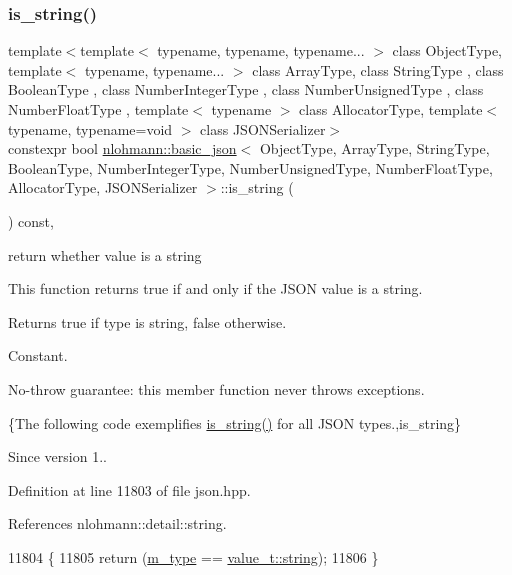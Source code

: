 \subsubsection{\texorpdfstring{is\+\_\+string()}{is\_string()}}
{\footnotesize\ttfamily template$<$template$<$ typename, typename, typename... $>$ class Object\+Type, template$<$ typename, typename... $>$ class Array\+Type, class String\+Type , class Boolean\+Type , class Number\+Integer\+Type , class Number\+Unsigned\+Type , class Number\+Float\+Type , template$<$ typename $>$ class Allocator\+Type, template$<$ typename, typename=void $>$ class J\+S\+O\+N\+Serializer$>$ \\
constexpr bool \hyperlink{classnlohmann_1_1basic__json}{nlohmann\+::basic\+\_\+json}$<$ Object\+Type, Array\+Type, String\+Type, Boolean\+Type, Number\+Integer\+Type, Number\+Unsigned\+Type, Number\+Float\+Type, Allocator\+Type, J\+S\+O\+N\+Serializer $>$\+::is\+\_\+string (\begin{DoxyParamCaption}{ }\end{DoxyParamCaption}) const\hspace{0.3cm}{\ttfamily [inline]}, {\ttfamily [noexcept]}}



return whether value is a string 

This function returns true if and only if the J\+S\+ON value is a string.

\begin{DoxyReturn}{Returns}
{\ttfamily true} if type is string, {\ttfamily false} otherwise.
\end{DoxyReturn}
Constant.

No-\/throw guarantee\+: this member function never throws exceptions.

\{The following code exemplifies {\ttfamily \hyperlink{classnlohmann_1_1basic__json_a69b596a4a6683b362095c9a139637396}{is\+\_\+string()}} for all J\+S\+ON types.,is\+\_\+string\}

\begin{DoxySince}{Since}
version 1.. 
\end{DoxySince}


Definition at line 11803 of file json.\+hpp.



References nlohmann\+::detail\+::string.


\begin{DoxyCode}
11804     \{
11805         \textcolor{keywordflow}{return} (\hyperlink{classnlohmann_1_1basic__json_a91990b60d7d4d67968a2c1db677536e7}{m\_type} == \hyperlink{namespacenlohmann_1_1detail_a1ed8fc6239da25abcaf681d30ace4985ab45cffe084dd3d20d928bee85e7b0f21}{value\_t::string});
11806     \}
\end{DoxyCode}
\mbox{\label{classnlohmann_1_1basic__json_a9f68a0af820c3ced7f9d17851ce4c22d}} 
